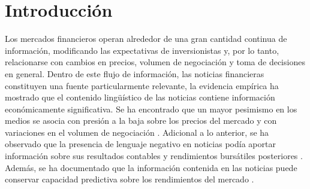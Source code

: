 \documentclass{Academic}
\begin{document}
\myabstract{}
\renewcommand{\myTitle}{Implementación de clasificador naïve Bayes como predictor del nivel de impacto de noticias financieras}
\renewcommand{\MyAuthors}{%
    Jessica Milagros Cordero Rivera$^{1}$ \quad
    Diego Rodrigo González Ramírez$^{1}$\\[0.2em]
    Jose Ángel Lechuga Carrasco$^{1}$ \quad
    Julio Lizárraga Beltrán$^{1}$
}

\renewcommand{\MyAffiliations}{%
    $^{1}$Escuela de Ingeniería y Ciencias
}

\renewcommand{\AuthorIDs}{%
    A01647083 \;|\; A01647198 \;|\; A00228198 \;|\; A01743628
}

\renewcommand{\ShortAuthors}{Cordero Rivera et al.}

\renewcommand{\Keywords}{noticias financieras, procesamiento de lenguaje natural, Naïve Bayes, clasificación de texto, impacto de mercado}
\maketitle
\onehalfspacing

\section{Introducción} 

Los mercados financieros operan alrededor de una gran cantidad continua 
de información, modificando las expectativas de inversionistas y, por lo tanto, 
relacionarse con cambios en precios, volumen de negociación y toma de decisiones 
en general. Dentro de este flujo de información, las noticias financieras constituyen una fuente 
particularmente relevante, la evidencia empírica ha mostrado que el 
contenido lingüístico de las noticias contiene información económicamente 
significativa. Se ha encontrado que un mayor pesimismo en los medios se 
asocia con presión a la baja sobre los precios del mercado y con variaciones 
en el volumen de negociación \cite{tetlock2007media}. Adicional a lo anterior, 
se ha observado que la presencia de lenguaje negativo en noticias podía 
aportar información sobre sus resultados contables y rendimientos 
bursátiles posteriores \cite{tetlock2008more}. Además, se ha documentado 
que la información contenida en las noticias puede conservar 
capacidad predictiva sobre los rendimientos del mercado \cite{heston2017news}.
\end{document}
